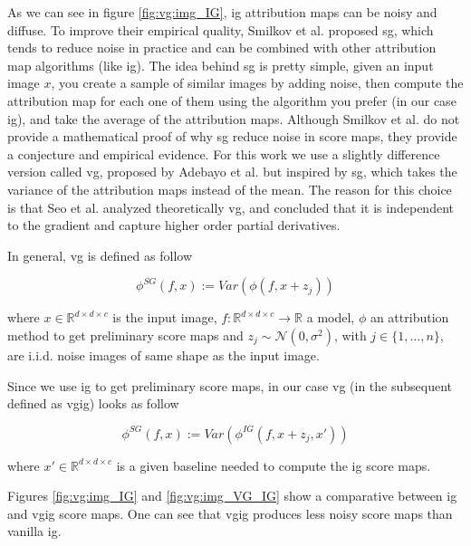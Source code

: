 \graphicspath{{./Sections/Basics/Resources/}}
\glsresetall

As we can see in figure \ref{fig:vg:img_IG}, \gls{ig} attribution maps can be noisy and diffuse. To improve their empirical quality, Smilkov et al. \cite{Smilkov_smoothgrad} proposed \gls{sg}, which tends to reduce noise in practice and can be combined with other attribution map algorithms (like \gls{ig}). The idea behind \gls{sg} is pretty simple, given an input image $x$, you create a sample of similar images by adding noise, then compute the attribution map for each one of them using the algorithm you prefer (in our case \gls{ig}), and take the average of the attribution maps.
Although Smilkov et al. do not provide a mathematical proof of why \gls{sg} reduce noise in score maps, they provide a conjecture and empirical evidence.
For this work we use a slightly difference version called \gls{vg}, proposed by Adebayo et al. \cite{adebayo2018local} but inspired by \gls{sg}, which takes the variance of the attribution maps instead of the mean. The reason for this choice is that Seo et al. \cite{Seo_noise} analyzed theoretically \gls{vg}, and concluded that it is independent to the gradient and capture higher order partial derivatives.

In general, \gls{vg} is defined as follow

\begin{equation}
  \phi^{SG}(f, x) := Var(\phi(f, x + z_j))
\end{equation}

\noindent where $x \in \mathbb{R}^{d \times d \times c}$ is the input image, $f:\mathbb{R}^{d \times d \times c} \rightarrow \mathbb{R}$ a model, $\phi$ an attribution method to get preliminary score maps and $z_j \sim \mathcal{N}(0, \sigma^2)$, with $j\in\{1, \dots, n\}$, are i.i.d. noise images of same shape as the input image.

Since we use \gls{ig} to get preliminary score maps, in our case \gls{vg} (in the subsequent defined as \gls{vgig}) looks as follow

\begin{equation}
  \phi^{SG}(f, x) := Var(\phi^{IG}(f, x + z_j, x'))
\end{equation}

\noindent where $x' \in \mathbb{R}^{d \times d \times c}$ is a given baseline needed to compute the \gls{ig} score maps.

Figures \ref{fig:vg:img_IG} and \ref{fig:vg:img_VG_IG} show a comparative between \gls{ig} and \gls{vgig} score maps. One can see that \gls{vgig} produces less noisy score maps than vanilla \gls{ig}.

